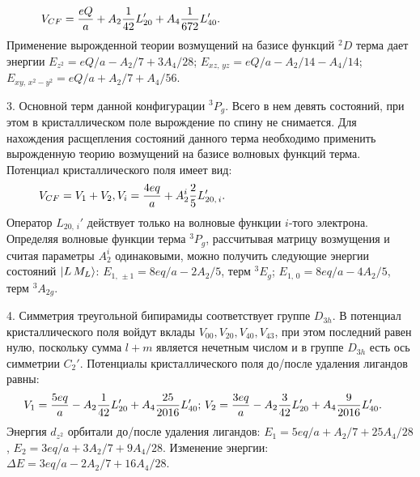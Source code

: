 \begin{equation*}
\begin{aligned}
& V_{CF}= \dfrac{eQ}{a} + A_2 \dfrac{1}{42}L_{20}' + A_4 \dfrac{1 }{672}L_{40}'. \hspace{46mm}
\end{aligned}
\end{equation*}
Применение вырожденной теории возмущений на базисе функций $^2D$ терма дает энергии $E_{z^2} = eQ/a - A_2/7 + {3A_4}/{28}$; $E_{xz,\, yz} = eQ/a -{A_2}/{14} - {A_4}/{14}$; $E_{xy,\,x^2-y^2} = eQ/a + {A_2}/{7} + {A_4}/{56}$.\par
3. Основной терм данной конфигурации $^3P_g$. Всего в нем девять состояний, при этом в кристаллическом поле вырождение по спину не снимается. Для нахождения расщепления состояний данного терма необходимо применить вырожденную теорию возмущений на базисе волновых функций терма. Потенциал кристаллического поля имеет вид:
\begin{equation*}
\begin{aligned}
& V_{CF}= V_{1}+V_{2}, V_i = \dfrac{4eq}{a} + A_{2}^i \dfrac{2}{5}L_{20,\,i}'. \hspace{45mm}
\end{aligned}
\end{equation*}
Оператор $L_{20,\,i}'$ действует только на волновые функции $i$-того электрона. Определяя волновые функции терма $^3P_g$, рассчитывая матрицу возмущения и считая параметры $A_{2}^i$ одинаковыми, можно получить следующие энергии состояний $\ket{L\,M_L}$: $E_{1,\,\pm 1}=8eq/a-2A_2/5$, терм $^3E_g$; $E_{1,\,0}=8eq/a-4A_2/5$, терм $^3A_{2g}$.\par
4. Симметрия треугольной бипирамиды соответствует группе $D_{3h}$. В потенциал кристаллического поля войдут вклады $V_{00}, V_{20}, V_{40}, V_{43}$, при этом последний равен нулю, поскольку сумма $l + m $ является нечетным числом и в группе $D_{3h}$ есть ось симметрии $C_2'$. Потенциалы кристаллического поля до/после удаления лигандов равны: 
\begin{equation*}
\begin{aligned}
& V_{1}= \dfrac{5eq}{a} - A_2 \dfrac{1}{42}L_{20}' + A_4 \dfrac{ 25 }{2016} L_{40}'; \, V_{2}= \dfrac{3eq}{a} - A_2 \dfrac{3}{42}L_{20}' + A_4 \dfrac{ 9 }{2016} L_{40}' . \hspace{1mm}
\end{aligned}
\end{equation*}
Энергия $d_{z^2}$ орбитали до/после удаления лигандов: $E_1= 5eq/a + {A_2}/{7} + {25A_4}/{28}$, $E_2= 3eq/a + {3A_2}/{7} + {9A_4}/{28}$. Изменение энергии: $\Delta E= 3eq/a - {2A_2}/{7} + {16A_4}/{28}$.\par
